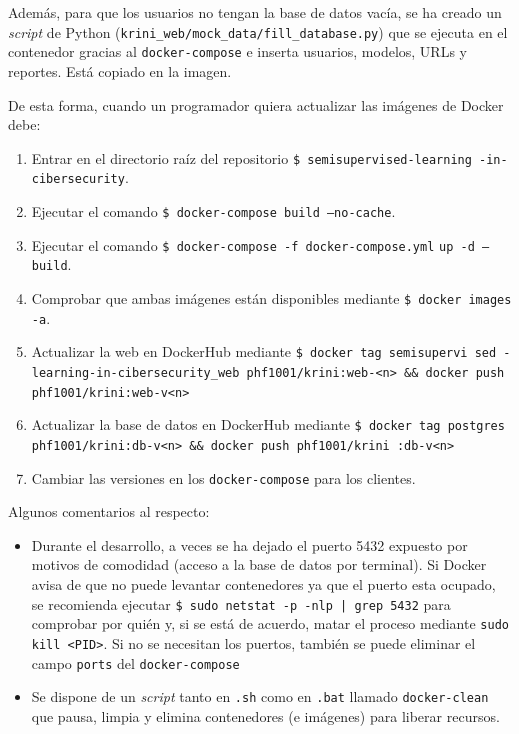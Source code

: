Además, para que los usuarios no tengan la base de datos vacía, se ha creado un \textit{script} de Python (\texttt{krini\_web/mock\_data/fill\_database.py}) que se ejecuta en el contenedor gracias al \texttt{docker-compose} e inserta usuarios, modelos, URLs y reportes. Está copiado en la imagen.

De esta forma, cuando un programador quiera actualizar las imágenes de Docker debe:

\begin{enumerate}
	\item Entrar en el directorio raíz del repositorio \texttt{\$ semisupervised-learning -in-cibersecurity}.
	\item Ejecutar el comando \texttt{\$ docker-compose build --no-cache}.
	\item Ejecutar el comando \texttt{\$ docker-compose -f docker-compose.yml} \texttt{up -d --build}.
	\item Comprobar que ambas imágenes están disponibles mediante \texttt{\$ docker images -a}.
	\item Actualizar la web en DockerHub mediante \texttt{\$ docker tag semisupervi sed -learning-in-cibersecurity\_web phf1001/krini:web-<n> \&\& docker push phf1001/krini:web-v<n>}
	\item Actualizar la base de datos en DockerHub mediante \texttt{\$ docker tag postgres phf1001/krini:db-v<n> \&\& docker push phf1001/krini :db-v<n>}
	\item Cambiar las versiones en los \texttt{docker-compose} para los clientes.
\end{enumerate}

Algunos comentarios al respecto:

\begin{itemize}
	\item Durante el desarrollo, a veces se ha dejado el puerto 5432 expuesto por motivos de comodidad (acceso a la base de datos por terminal). Si Docker avisa de que no puede levantar contenedores ya que el puerto esta ocupado, se recomienda ejecutar \texttt{\$ sudo netstat -p -nlp | grep 5432} para comprobar por quién y, si se está de acuerdo, matar el proceso mediante \texttt{sudo kill <PID>}. Si no se necesitan los puertos, también se puede eliminar el campo \texttt{ports} del \texttt{docker-compose}
	
	\item Se dispone de un \textit{script} tanto en \texttt{.sh} como en \texttt{.bat} llamado \texttt{docker-clean} que pausa, limpia y elimina contenedores (e imágenes) para liberar recursos. 
\end{itemize}


